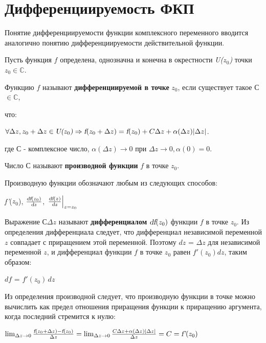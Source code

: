 \documentclass[a4paper, 12pt]{report}
\begin{document}
\section{Дифференциируемость ФКП}
Понятие дифференциируемости функции комплексного переменного вводится аналогично понятию дифференциируемости действительной функции.
\par\bigskip
Пусть функция $f$ определена, однозначна и конечна в окрестности \textsl{U($z_0$)} точки $z_0 \in \mathbb{C}$. 
\par Функцию $f$ называют \textbf{дифференциируемой в точке} $z_0$, если существует такое С $\in \mathbb{C}$,
\par что:
\par\bigskip
\begin{center}
$\forall \Delta z, z_0 + \Delta z \in \textsl{U($z_0$)} \Rightarrow \textsl{f} (z_0 + \Delta z) = \textsl{f} (z_0) + C\Delta z + \alpha(\Delta z)|\Delta z|$.
\end{center}
\par\bigskip
где С - комплексное число, $\alpha (\Delta z) \to 0$ при $\Delta z \to 0, \alpha (0) = 0$.
\par
Число С называют \textbf{производной функции} $f$ в точке $z_0$.
\par
Производную функции обозначают любым из следующих способов:
\par\bigskip
\begin{center}
\textsl{f'}($z_0$), $\frac{\textsl{df}(z_0)}{\textsl{d}z}$,
$\left. \frac{\textsl{df}(z)}{\textsl{d}z} \right |_{z=z_0}$
\end{center}
\par\bigskip
Выражение С$\Delta z$ называют \textbf{дифференциалом} $\textsl{df}(z_0)$ функции $f$ в точке $z_0$.
\newline
Из определения дифференциала следует, что дифференциал независимой переменной $z$ совпадает с приращением этой переменной. Поэтому $dz$ = $\Delta z$ для независимой переменной $z$, и дифференциал функции $f$ в точке $z_0$ равен $f'(z_0)dz$, таким образом:
\par\bigskip
\begin{center}
$df$ = $f'(z_0)\,dz$
\end{center}
\par\bigskip
Из определения производной следует, что производную функции в точке можно вычислить как предел отношения приращения функции к приращению аргумента, когда последний стремится к нулю:
\par\bigskip
\begin{center}
$ \lim_{\Delta z \to 0} \frac{\textsl{f} (z_0 + \Delta z) - \textsl{f} (z_0)}{\Delta z} = \lim_{\Delta z \to 0} \frac{C\Delta z + \alpha(\Delta z)|\Delta z|}{\Delta z} = C = \textsl{f'}(z_0)$
\end{center}
\end{document}
